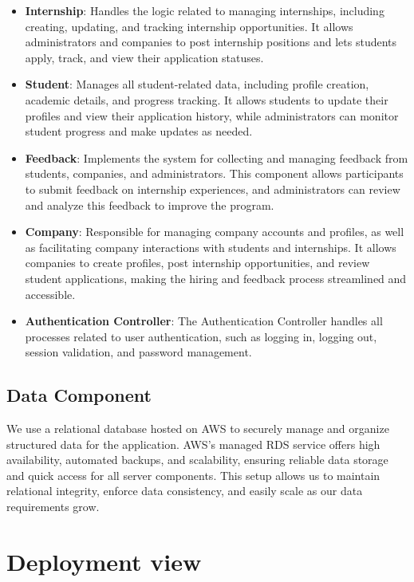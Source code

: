 \begin{itemize}
\item \textbf{Internship}: Handles the logic related to managing internships, including creating, updating, and tracking internship opportunities. It allows administrators and companies to post internship positions and lets students apply, track, and view their application statuses.

\item \textbf{Student}: Manages all student-related data, including profile creation, academic details, and progress tracking. It allows students to update their profiles and view their application history, while administrators can monitor student progress and make updates as needed.

\item \textbf{Feedback}: Implements the system for collecting and managing feedback from students, companies, and administrators. This component allows participants to submit feedback on internship experiences, and administrators can review and analyze this feedback to improve the program.

\item \textbf{Company}: Responsible for managing company accounts and profiles, as well as facilitating company interactions with students and internships. It allows companies to create profiles, post internship opportunities, and review student applications, making the hiring and feedback process streamlined and accessible.


\item \textbf{Authentication Controller}:
The Authentication Controller handles all processes related to user authentication, such as logging in, logging out, session validation, and password management.
\end{itemize}

\subsection{Data Component}

We use a relational database hosted on AWS to securely manage and organize structured data for the application. AWS’s managed RDS service offers high availability, automated backups, and scalability, ensuring reliable data storage and quick access for all server components. This setup allows us to maintain relational integrity, enforce data consistency, and easily scale as our data requirements grow.
\section{Deployment view}

